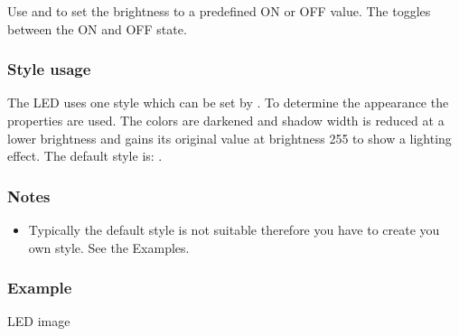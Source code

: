 \documentclass[letterpaper,10pt,english]{sphinxmanual}
\begin{document}
Use  and  to set the brightness to a predefined  ON or OFF value.  The  toggles between the ON and OFF state.


\subsubsection{Style usage}
\label{\detokenize{object-types/led:style-usage}}
The LED uses one style which can be set by . To determine the appearance the  properties are used. The colors are darkened and shadow width is reduced at a lower brightness and gains its original value at brightness 255 to show a lighting effect.  The default style is: .


\subsubsection{Notes}
\label{\detokenize{object-types/led:notes}}\begin{itemize}
\item {} 
Typically the default style is not suitable therefore you have to create you own style. See the Examples.

\end{itemize}


\subsubsection{Example}
\label{\detokenize{object-types/led:example}}
LED image
\end{document}
